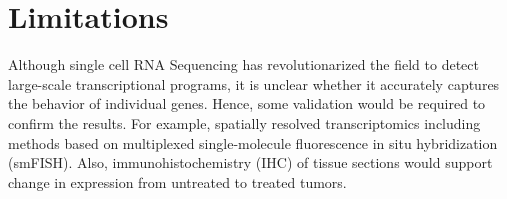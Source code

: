 



\section{Limitations}

Although single cell RNA Sequencing has revolutionarized the field to detect large-scale transcriptional programs, it is unclear whether it accurately captures the behavior of individual genes. Hence, some validation would be required to confirm the results. For example, spatially resolved transcriptomics including methods based on multiplexed single-molecule fluorescence in situ hybridization (smFISH). Also, immunohistochemistry (IHC) of tissue sections would support change in expression from untreated to treated tumors.


